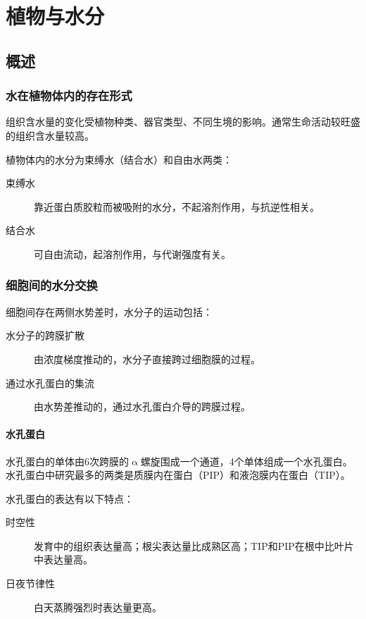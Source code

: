 \section{植物与水分}

\subsection{概述}

\subsubsection{水在植物体内的存在形式}

组织含水量的变化受植物种类、器官类型、不同生境的影响。通常生命活动较旺盛的组织含水量较高。

植物体内的水分为束缚水（结合水）和自由水两类：

\begin{description}
	\item[束缚水] 靠近蛋白质胶粒而被吸附的水分，不起溶剂作用，与抗逆性相关。
	\item[结合水] 可自由流动，起溶剂作用，与代谢强度有关。
\end{description}

\subsubsection{细胞间的水分交换}

细胞间存在两侧水势差时，水分子的运动包括：
\begin{description}
	\item[水分子的跨膜扩散] 由浓度梯度推动的，水分子直接跨过细胞膜的过程。
	\item[通过水孔蛋白的集流] 由水势差推动的，通过水孔蛋白介导的跨膜过程。
\end{description}

\paragraph{水孔蛋白}

水孔蛋白的单体由6次跨膜的$\upalpha$螺旋围成一个通道，4个单体组成一个水孔蛋白。水孔蛋白中研究最多的两类是质膜内在蛋白（PIP）和液泡膜内在蛋白（TIP）。

水孔蛋白的表达有以下特点：
\begin{description}
	\item[时空性] 发育中的组织表达量高；根尖表达量比成熟区高；TIP和PIP在根中比叶片中表达量高。
	\item[日夜节律性] 白天蒸腾强烈时表达量更高。
\end{description}

